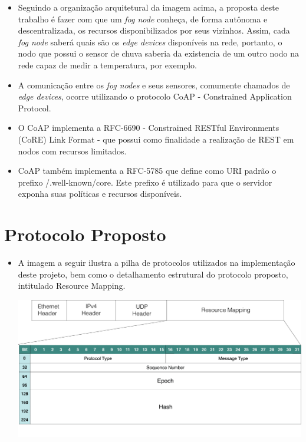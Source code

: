 \documentclass[a0,portrait]{lab-poster}
\begin{document}
\begin{multicols}{2}
\begin{itemize}
\item Seguindo a organização arquitetural da imagem acima, a proposta deste trabalho é fazer com que um \textit{fog node} conheça, de forma autônoma e descentralizada, os recursos disponibilizados por seus vizinhos.
Assim, cada \textit{fog node} saberá quais são os \textit{edge devices} disponíveis na rede, portanto,
o nodo que possui o sensor de chuva saberia da existencia de um outro nodo na rede capaz de medir a temperatura, por exemplo.

\item A comunicação entre os \textit{fog nodes} e seus sensores, comumente chamados de \textit{edge devices}, ocorre utilizando o protocolo CoAP - Constrained Application Protocol.
\item O CoAP implementa a RFC-6690 - Constrained RESTful Environments (CoRE) Link Format - que possui como finalidade a realização de REST em nodos com recursos limitados\cite{rfc6690}.
\item CoAP também implementa a RFC-5785 que define como URI padrão o prefixo /.well-known/core. Este prefixo é utilizado para que o servidor exponha suas políticas e recursos disponíveis\cite{rfc5785}.

\end{itemize}

\section*{\huge Protocolo Proposto}

\Large
\justifying
\begin{itemize}

\item A imagem a seguir ilustra a pilha de protocolos utilizados na implementação deste projeto, bem como o detalhamento estrutural do protocolo proposto, intitulado Resource Mapping.


\begin{center}
\includegraphics[width=0.7\linewidth]{fig/fig2.png}
\end{center}


\end{itemize}
\end{multicols}
\end{document}
